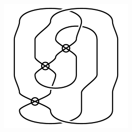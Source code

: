\begin{figure}[H]
\begin{minipage}[b]{.18\linewidth}
\end{minipage}
\begin{minipage}[b]{.18\linewidth}
\centering
\includegraphics[width=\linewidth]{../data/virtual_4_36.png}
\end{minipage}
\end{figure}


